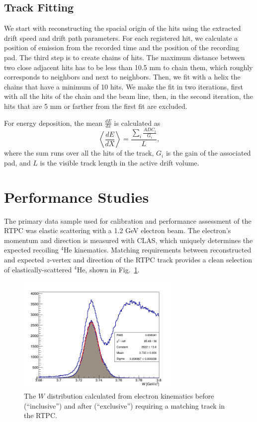 \documentclass[preprint,5p]{elsarticle}
\begin{document}
\subsection{Track Fitting}\label{sec_rec}
We start with reconstructing the spacial origin of the hits using the extracted drift speed and drift path 
parameters. For each registered hit, we calculate a position of emission from 
the recorded time and the position of the recording pad. The third step 
is to create chains of hits. The maximum distance between two close adjacent 
hits has to be less than 10.5 mm to chain them, which roughly corresponds to 
neighbors and next to neighbors. Then, we fit with a helix the chains that have a minimum of 
10 hits. We make the fit in two iterations, first with all the hits of the chain 
and the beam line, then, in the second iteration, 
the hits that are 5 mm or farther from the first fit are excluded.

For energy deposition, the mean $\frac{dE}{dx}$ is calculated as
\begin{equation}
 \left\langle \frac{dE}{dX} \right\rangle= \frac{\sum\limits_{i} \frac{ADC_{i}}{G_i}}{L},
\end{equation}
where the sum runs over all the hits of the track, $G_{i}$ is the gain of 
the associated pad, and $L$ is the visible track length in the active drift 
volume. 

\section{Performance Studies}\label{sec_perfor}

The primary data sample used for calibration and performance assessment of the
RTPC was elastic scattering with a 1.2 GeV electron beam.  The electron's momentum
and direction is measured with CLAS, which uniquely determines the expected recoiling
$^4$He kinematics.  Matching requirements between reconstructed and expected $z$-vertex
and direction of the RTPC track provides a clean selection of elastically-scattered
$^4$He, shown in Fig.~\ref{fig:w}.


\begin{figure}[tb]\centering
  \includegraphics[width=8cm]{fig/fit_W_distribution_l.png}
  \caption{The $W$ distribution calculated from electron kinematics before (``inclusive'')
  and after (``exclusive'') requiring a matching track in the RTPC.\label{fig:w}}
\end{figure}
\end{document}
